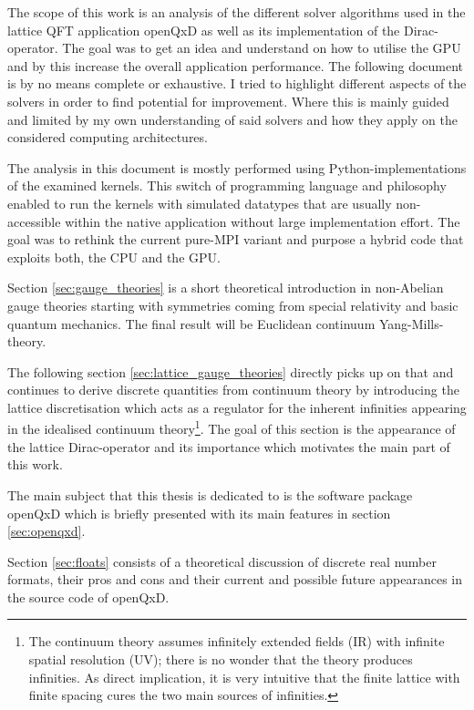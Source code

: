 \documentclass{article}
\theoremstyle{plain} %
\theoremstyle{convention} %
\theoremstyle{remark} %
\numberwithin{equation}{section}
\begin{document}
The scope of this work is an analysis of the different solver algorithms used in the lattice QFT application openQxD \cite{openqxd} as well as its implementation of the Dirac-operator. The goal was to get an idea and understand on how to utilise the GPU and by this increase the overall application performance. The following document is by no means complete or exhaustive. I tried to highlight different aspects of the solvers in order to find potential for improvement. Where this is mainly guided and limited by my own understanding of said solvers and how they apply on the considered computing architectures.

The analysis in this document is mostly performed using Python-implementations of the examined kernels. This switch of programming language and philosophy enabled to run the kernels with simulated datatypes that are usually non-accessible within the native application without large implementation effort. The goal was to rethink the current pure-MPI variant and purpose a hybrid code that exploits both, the CPU and the GPU. 

Section \ref{sec:gauge_theories} is a short theoretical introduction in non-Abelian gauge theories starting with symmetries coming from special relativity and basic quantum mechanics. The final result will be Euclidean continuum Yang-Mills-theory.

The following section \ref{sec:lattice_gauge_theories} directly picks up on that and continues to derive discrete quantities from continuum theory by introducing the lattice discretisation which acts as a regulator for the inherent infinities appearing in the idealised continuum theory\footnote{The continuum theory assumes infinitely extended fields (IR) with infinite spatial resolution (UV); there is no wonder that the theory produces infinities. As direct implication, it is very intuitive that the finite lattice with finite spacing cures the two main sources of infinities.}. The goal of this section is the appearance of the lattice Dirac-operator and its importance which motivates the main part of this work.

The main subject that this thesis is dedicated to is the software package openQxD which is briefly presented with its main features in section \ref{sec:openqxd}.

Section \ref{sec:floats} consists of a theoretical discussion of discrete real number formats, their pros and cons and their current and possible future appearances in the source code of openQxD.
\end{document}
